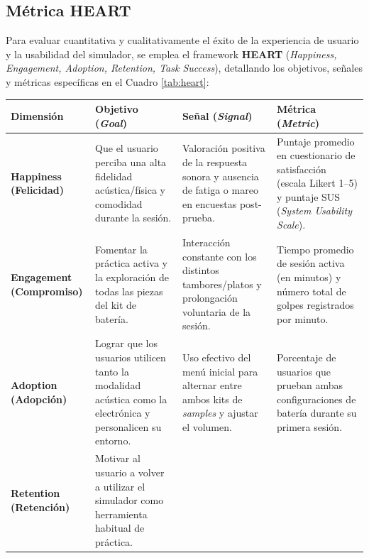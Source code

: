 \documentclass{article}
\begin{document}
\subsection{Métrica HEART}
Para evaluar cuantitativa y cualitativamente el éxito de la experiencia de usuario y la usabilidad del simulador, se emplea el framework \textbf{HEART} (\textit{Happiness, Engagement, Adoption, Retention, Task Success}), detallando los objetivos, señales y métricas específicas en el Cuadro \ref{tab:heart}:

\begin{table}[H]
\centering
\small
\renewcommand{\arraystretch}{1.4} %
\begin{tabular}{@{} >{\bfseries}p{} >{\raggedright\arraybackslash}p{} >{\raggedright\arraybackslash}p{} >{\raggedright\arraybackslash}p{} @{}}
\toprule
Dimensión & \textbf{Objetivo (\textit{Goal})} & \textbf{Señal (\textit{Signal})} & \textbf{Métrica (\textit{Metric})} \\
\midrule
Happiness \newline \normalfont\footnotesize(Felicidad) &
Que el usuario perciba una alta fidelidad acústica/física y comodidad durante la sesión. &
Valoración positiva de la respuesta sonora y ausencia de fatiga o mareo en encuestas post-prueba. &
Puntaje promedio en cuestionario de satisfacción (escala Likert 1--5) y puntaje SUS (\textit{System Usability Scale}). \\
\addlinespace[0.4em]
Engagement \newline \normalfont\footnotesize(Compromiso) &
Fomentar la práctica activa y la exploración de todas las piezas del kit de batería. &
Interacción constante con los distintos tambores/platos y prolongación voluntaria de la sesión. &
Tiempo promedio de sesión activa (en minutos) y número total de golpes registrados por minuto. \\
\addlinespace[0.4em]
Adoption \newline \normalfont\footnotesize(Adopción) &
Lograr que los usuarios utilicen tanto la modalidad acústica como la electrónica y personalicen su entorno. &
Uso efectivo del menú inicial para alternar entre ambos kits de \textit{samples} y ajustar el volumen. &
Porcentaje de usuarios que prueban ambas configuraciones de batería durante su primera sesión. \\
\addlinespace[0.4em]
Retention \newline \normalfont\footnotesize(Retención) &
Motivar al usuario a volver a utilizar el simulador como herramienta habitual de práctica. &

\end{tabular}
\end{table}
\end{document}
